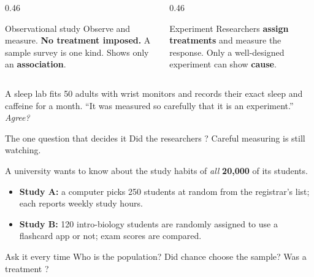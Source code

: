 \documentclass[aspectratio=169, 11pt]{beamer}
\begin{document}
\begin{frame}[t, plain]
  \vspace{2pt}
  \begin{columns}[t]
    \begin{column}{0.46\textwidth}
      \begin{block}{Observational study}
        Observe and measure. \textbf{No treatment imposed.} A sample survey is one kind.
        Shows only an \textbf{association}.
      \end{block}
    \end{column}
    \begin{column}{0.46\textwidth}
      \begin{block}{Experiment}
        Researchers \textbf{assign treatments} and measure the response. Only a well-designed
        experiment can show \textbf{cause}.
      \end{block}
    \end{column}
  \end{columns}
  \vspace{8pt}
  A sleep lab fits 50 adults with wrist monitors and records their exact sleep and caffeine for
  a month. ``It was measured so carefully that it is an experiment.'' \emph{Agree?}
  \vspace{6pt}
  \begin{block}{The one question that decides it}
    Did the researchers ? Careful measuring is still watching.
  \end{block}
\end{frame}

\begin{frame}[t, plain]
  A university wants to know about the study habits of \emph{all} \textbf{20{,}000} of its
  students.
  \vspace{4pt}
  \begin{itemize}\setlength{\itemsep}{3pt}
    \item \textbf{Study A:} a computer picks 250 students at random from the registrar's list;
          each reports weekly study hours.
    \item \textbf{Study B:} 120 intro-biology students are randomly assigned to use a flashcard
          app or not; exam scores are compared.
  \end{itemize}
  \vspace{4pt}
  \begin{block}{Ask it every time}
    Who is the population? Did chance choose the sample? Was a treatment
    ?
  \end{block}
\end{frame}
\end{document}
